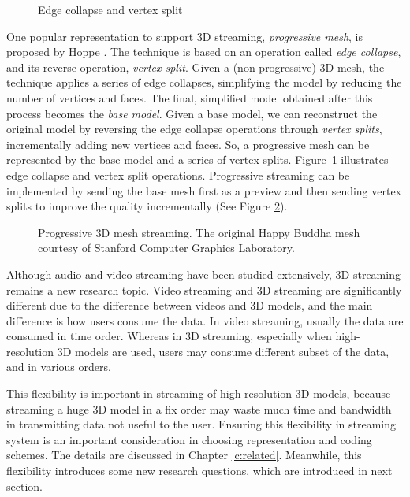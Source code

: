 \documentclass[11pt, a4paper]{report}
\begin{document}
\begin{figure}[htbp!]
\centering
{}
\caption{Edge collapse and vertex split}\label{f:intro:split2}
\end{figure}
    One popular representation to support 3D streaming, \textit{progressive mesh}, 
    is proposed by Hoppe \cite{hoppe96progressive}.
    The technique is based on an
    operation called \textit{edge collapse}, and its reverse
    operation, \textit{vertex split}.  Given a (non-progressive)
    3D mesh, the technique applies a series of edge collapses,
    simplifying the model by reducing the number of vertices and
    faces.  The final, simplified model obtained after this
    process becomes the \textit{base model}.  Given a base model,
    we can reconstruct the original model by reversing
    the edge collapse operations through \textit{vertex splits},
    incrementally adding new vertices and faces. So, a
    progressive mesh can be represented by the base
    model and a series of vertex splits.  
    Figure~\ref{f:intro:split2} illustrates edge
    collapse and vertex split operations.
    Progressive streaming can be implemented by sending the base mesh
    first as a preview and then sending vertex splits to improve 
    the quality incrementally (See Figure \ref{f:intro:progressive}).
    \begin{figure}[htbp!]
    \centering
    \caption{
    Progressive 3D mesh streaming. The original Happy Buddha mesh 
    courtesy of Stanford Computer Graphics Laboratory.
    \label{f:intro:progressive}}
    \end{figure}
    
    Although audio and video streaming have been studied extensively, 
    3D streaming remains a new research topic. 
    Video streaming and 3D streaming are significantly different
    due to the difference between videos and 3D models, and
    the main difference is how users consume the data.
    In video streaming, usually the data are consumed in time order. 
    Whereas in 3D streaming, especially when high-resolution 3D models are used,
    users may consume different subset of the data, and in various orders.
    
    This flexibility is important in streaming of high-resolution 3D models, 
    because streaming a huge 3D model in a fix order may waste much time and bandwidth in 
    transmitting data not useful to the user. 
    Ensuring this flexibility in streaming system is an important consideration
    in choosing representation and coding schemes. The details are discussed
    in Chapter \ref{c:related}.
    Meanwhile, this flexibility introduces some new research questions, 
    which are introduced in next section. 
\end{document}
